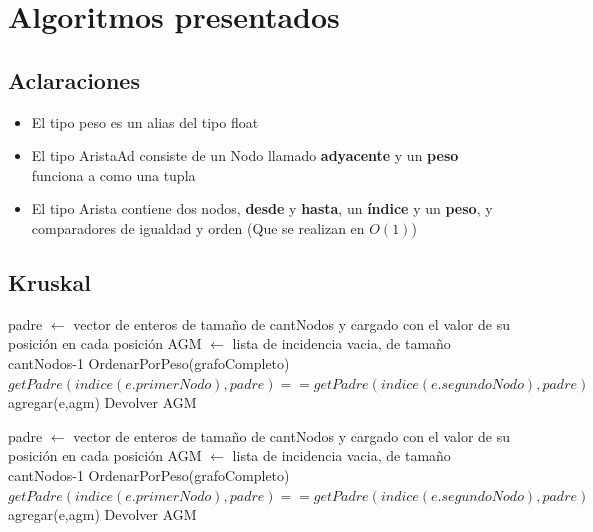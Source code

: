 \documentclass[11pt,a4paper]{article}
\begin{document}
\section{Algoritmos presentados}

\subsection{Aclaraciones}
\begin{itemize}
	\item El tipo peso es un alias del tipo float
	\item El tipo AristaAd consiste de un Nodo llamado \textbf{adyacente} y un \textbf{peso} funciona a como una tupla
	\item El tipo Arista contiene dos nodos, \textbf{desde} y \textbf{hasta}, un \textbf{índice} y un \textbf{peso}, y comparadores de igualdad y orden (Que se realizan en $O(1)$) 
\end{itemize}

\subsection{Kruskal}
\begin{codebox}
		\li padre $\gets$ vector de enteros de tamaño de cantNodos y cargado con el valor
		\zi 	 de su posición en cada posición
		\li AGM $\gets$ lista de incidencia vacia, de tamaño cantNodos-1
		\li OrdenarPorPeso(grafoCompleto)
		\li {} \Do
			\li \If $getPadre(indice(e.primerNodo), padre) == getPadre(indice(e.segundoNodo),padre)$ \Then
					\li agregar(e,agm)
				\End
			\End
	\li Devolver AGM
\end{codebox}

\begin{codebox}
		\li padre $\gets$ vector de enteros de tamaño de cantNodos y cargado con el valor
		\zi 	 de su posición en cada posición
		\li AGM $\gets$ lista de incidencia vacia, de tamaño cantNodos-1
		\li OrdenarPorPeso(grafoCompleto)
		\li {} \Do
			\li \If $getPadre(indice(e.primerNodo), padre) == getPadre(indice(e.segundoNodo),padre)$ \Then
					\li agregar(e,agm)
				\End
			\End
	\li Devolver AGM
\end{codebox}
\end{document}
